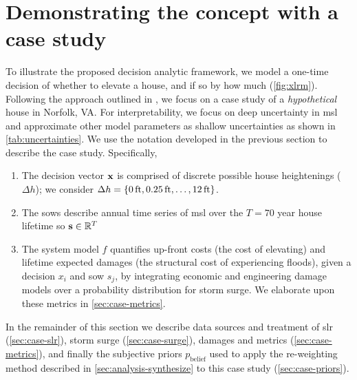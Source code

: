 \documentclass{agujournal2019}
\providecommand{\DIFaddend}{} %
\DeclareRobustCommand{\DIFaddend}{\DIFOaddend \let\includegraphics\DIFOincludegraphics} %
\begin{document}
\DIFaddend \section{Demonstrating the concept with a case study}\label{sec:case-study}

To illustrate the proposed decision analytic framework, we model a one-time decision of whether to elevate a house, and if so by how much (\cref{fig:xlrm}).
Following the approach outlined in , we focus on a case study of a \emph{hypothetical} house in Norfolk, VA.
For interpretability, we focus on deep uncertainty in \gls{msl} and approximate other model parameters as shallow uncertainties as shown in \cref{tab:uncertainties}.
We use the notation developed in the previous section to describe the case study.
Specifically,
\begin{enumerate}
  \item The decision vector $\vb{x}$ is comprised of discrete possible house heightenings ($\Delta h$); we consider $\Delta h = \qty{\SI{0}{ft}, \SI{0.25}{ft}, \ldots, \SI{12}{ft}}$.
  \item The \glspl{sow} describe annual time series of \gls{msl} over the $T=70$ year house lifetime so $\vb{s} \in \mathbb{R}^T$
  \item The system model $f$ quantifies up-front costs (the cost of elevating) and lifetime expected damages (the structural cost of experiencing floods), given a decision $x_i$ and \gls{sow} $s_j$, by integrating economic and engineering damage models over a probability distribution for storm surge. We elaborate upon these metrics in \cref{sec:case-metrics}.
\end{enumerate}
In the remainder of this section we describe data sources and treatment of \gls{slr} (\cref{sec:case-slr}), storm surge (\cref{sec:case-surge}), damages and metrics (\cref{sec:case-metrics}), and finally the subjective priors $p_\mathrm{belief}$ used to apply the re-weighting method described in \cref{sec:analysis-synthesize} to this case study (\cref{sec:case-priors}).
\end{document}
